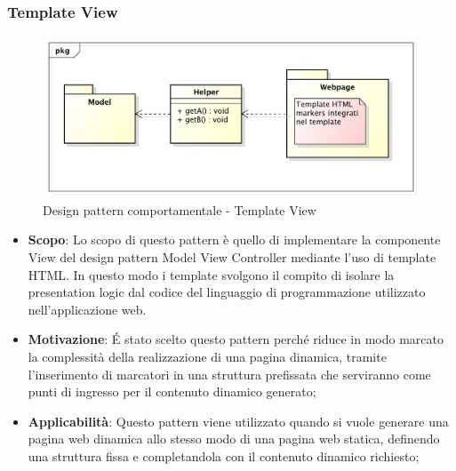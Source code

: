 		\newpage
		\subsubsection{Template View} %
		\begin{figure}[htbp]
			\centering
			\centerline{\includegraphics[scale=0.5]{./images/designpatternappendice/template_view.pdf}}
			\caption{Design pattern comportamentale - Template View}
		\end{figure}

		\begin{itemize}
			\item \textbf{Scopo}: Lo scopo di questo pattern è quello di implementare la componente View del design pattern Model View Controller mediante l'uso di template HTML. In questo modo i template svolgono il compito di isolare la presentation logic dal codice del linguaggio di programmazione utilizzato nell'applicazione web.
			\item \textbf{Motivazione}: \'E stato scelto questo pattern perché riduce in modo marcato la complessità della realizzazione di una pagina dinamica, tramite l'inserimento di marcatori in una struttura prefissata che serviranno come punti di ingresso per il contenuto dinamico generato;
			\item \textbf{Applicabilità}: Questo pattern viene utilizzato quando si vuole generare una pagina web dinamica allo stesso modo di una pagina web statica, definendo una struttura fissa e completandola con il contenuto dinamico richiesto;
		\end{itemize}

		\newpage

